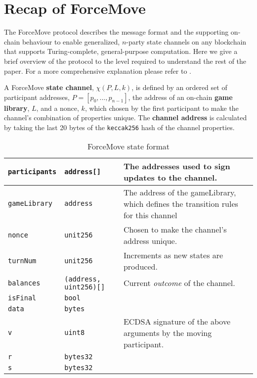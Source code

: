 
\usepackage{stmaryrd}

\newcommand{\adj}[1]{\llbracket #1 \rrbracket} 



\maketitle

\section{Recap of ForceMove}

The ForceMove protocol describes the message format and the supporting on-chain behaviour
to enable generalized, $n$-party state channels on any blockchain that supports Turing-complete, general-purpose
computation. Here we give a brief overview of the protocol to the level required to understand
the rest of the paper. For a more comprehensive explanation please refer to \cite{}.

A ForceMove \textbf{state channel}, $\chi(P, L, k)$, is defined by an ordered set of participant
addresses, $P = [p_0, ..., p_{n-1}]$, the address of an on-chain \textbf{game library}, $L$,
and a nonce, $k$, which chosen by the first participant to make the channel's combination of properties unique.
The \textbf{channel address} is calculated by taking the last 20 bytes of the \texttt{keccak256}
hash of the channel properties. 

\begin{table}[h]
  \begin{tabular}{|l|l|p{5cm}|}
    \hline
    \texttt{participants} & \texttt{address[]} & The addresses used to sign updates to the channel. \\ \hline
    \texttt{gameLibrary} & \texttt{address} & The address of the gameLibrary, which defines the transition rules for this channel \\ \hline
    \texttt{nonce} & \texttt{unit256} & Chosen to make the channel's address unique. \\ \hline
    \texttt{turnNum} & \texttt{unit256} & Increments as new states are produced. \\ \hline
    \texttt{balances} & \texttt{(address, uint256)[]} & Current \textit{outcome} of the channel. \\ \hline
    \texttt{isFinal} & \texttt{bool} & \\ \hline
    \texttt{data} & \texttt{bytes} & \\ \hline
    \texttt{v} & \texttt{uint8} & ECDSA signature of the above arguments by the moving participant. \\ \cline{1-2}
    \texttt{r} & \texttt{bytes32} & \\ \cline{1-2}
    \texttt{s} & \texttt{bytes32} & \\ \hline
  \end{tabular}
  \caption{ForceMove state format}
  \label{table:force-move-state}
\end{table}

